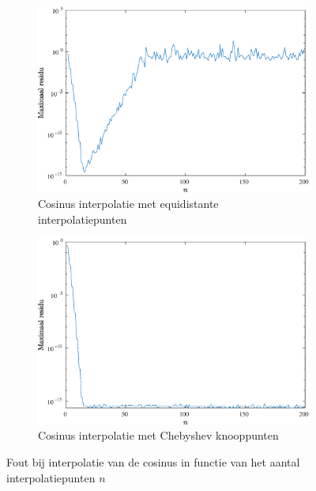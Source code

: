\documentclass[a4paper, 12pt, titlepage, fleqn]{article}
\begin{document}
\begin{figure}
\begin{subfigure}[b]{0.45\textwidth}
\includegraphics[width=\linewidth]{../Afbeeldingen/cos_equi_fout.eps}
\caption{Cosinus interpolatie met equidistante interpolatiepunten}
\end{subfigure}
\hfill
\begin{subfigure}[b]{0.45\textwidth}
\includegraphics[width=\linewidth]{../Afbeeldingen/cos_nul_fout.eps}
\caption{Cosinus interpolatie met Chebyshev knooppunten}
\end{subfigure}
\caption[Maximale fout bij cosinus interpolatie]{Fout bij interpolatie van de cosinus in functie van het aantal interpolatiepunten $n$}
\label{fig:cosFout}
\end{figure}
\end{document}
